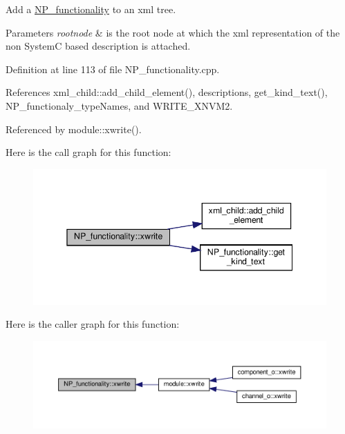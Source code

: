 Add a \hyperlink{classNP__functionality}{N\+P\+\_\+functionality} to an xml tree. 


\begin{DoxyParams}{Parameters}
{\em rootnode} & is the root node at which the xml representation of the non SystemC based description is attached. \\
\hline
\end{DoxyParams}


Definition at line 113 of file N\+P\+\_\+functionality.\+cpp.



References xml\+\_\+child\+::add\+\_\+child\+\_\+element(), descriptions, get\+\_\+kind\+\_\+text(), N\+P\+\_\+functionaly\+\_\+type\+Names, and W\+R\+I\+T\+E\+\_\+\+X\+N\+V\+M2.



Referenced by module\+::xwrite().

Here is the call graph for this function\+:
\nopagebreak
\begin{figure}[H]
\begin{center}
\leavevmode
\includegraphics[width=345pt]{d8/dda/classNP__functionality_abef0c8beb48664e17a7089af4945d2a2_cgraph}
\end{center}
\end{figure}
Here is the caller graph for this function\+:
\nopagebreak
\begin{figure}[H]
\begin{center}
\leavevmode
\includegraphics[width=350pt]{d8/dda/classNP__functionality_abef0c8beb48664e17a7089af4945d2a2_icgraph}
\end{center}
\end{figure}


